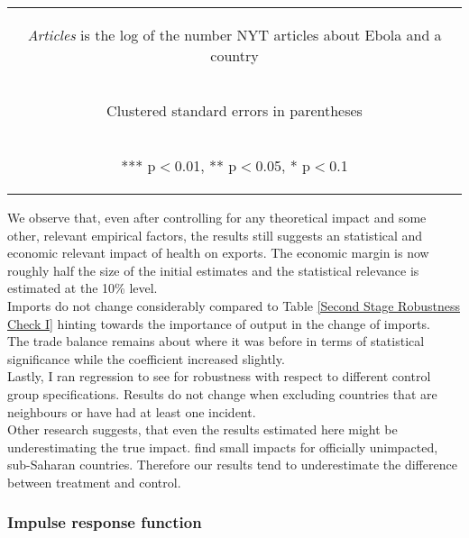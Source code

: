 \documentclass{article}
\begin{document}
\begin{table}[htbp]
{\begin{tabular}{lccc}
\multicolumn{4}{c}{\begin{footnotesize} \textit{Articles} is the log of the number NYT articles about Ebola and a country \end{footnotesize} }\\
\multicolumn{4}{c}{\begin{footnotesize} Clustered standard errors in parentheses\end{footnotesize}} \\
\multicolumn{4}{c}{\begin{footnotesize} *** p$<$0.01, ** p$<$0.05, * p$<$0.1\end{footnotesize}} \\
\end{tabular}
}
\end{table}
We observe that, even after controlling for any theoretical impact and some other, relevant empirical factors, the results still suggests an statistical and economic relevant impact of health on exports. The economic margin is now roughly half the size of the initial estimates and the statistical relevance is estimated at the 10\% level.\\
Imports do not change considerably compared to Table \ref{Second Stage Robustness Check I} hinting towards the importance of output in the change of imports. \\
The trade balance remains about where it was before in terms of statistical significance while the coefficient increased slightly.\\
Lastly, I ran regression to see for robustness with respect to different control group specifications. Results do not change when excluding countries that are neighbours or have had at least one incident. \\
Other research suggests, that even the results estimated here might be underestimating the true impact. \cite{thomas2015economic} find small impacts for officially unimpacted, sub-Saharan countries. Therefore our results tend to underestimate the difference between treatment and control.

\subsubsection{Impulse response function}
\end{document}
